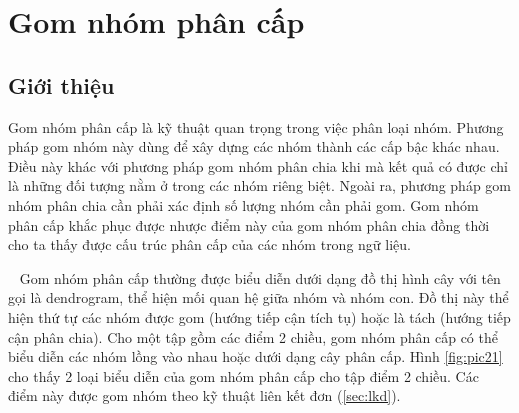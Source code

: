 \chapter{Gom nhóm phân cấp}
\label{Chapter2}

\section{Giới thiệu}
Gom nhóm phân cấp là kỹ thuật quan trọng trong việc phân loại nhóm. Phương pháp gom nhóm này dùng để xây dựng các nhóm thành các cấp bậc khác nhau.
Điều này khác với phương pháp gom nhóm phân chia khi mà kết quả có được chỉ là những đối tượng nằm ở trong các nhóm riêng biệt.
Ngoài ra, phương pháp gom nhóm phân chia cần phải xác định số lượng nhóm cần phải gom.
Gom nhóm phân cấp khắc phục được nhược điểm này của gom nhóm phân chia đồng thời cho ta thấy được cấu trúc phân cấp của các nhóm trong ngữ liệu.

~\cite{Vipin-Kumar} Gom nhóm phân cấp thường được biểu diễn dưới dạng đồ thị hình cây với tên gọi là dendrogram, thể hiện mối quan hệ giữa nhóm và nhóm con.
Đồ thị này thể hiện thứ tự các nhóm được gom (hướng tiếp cận tích tụ) hoặc là tách (hướng tiếp cận phân chia). 
Cho một tập gồm các điểm 2 chiều, gom nhóm phân cấp có thể biểu diễn các nhóm lồng vào nhau hoặc dưới dạng cây phân cấp.
Hình \ref{fig:pic21} cho thấy 2 loại biểu diễn của gom nhóm phân cấp cho tập điểm 2 chiều.
Các điểm này được gom nhóm theo kỹ thuật liên kết đơn (\ref{sec:lkd}).

